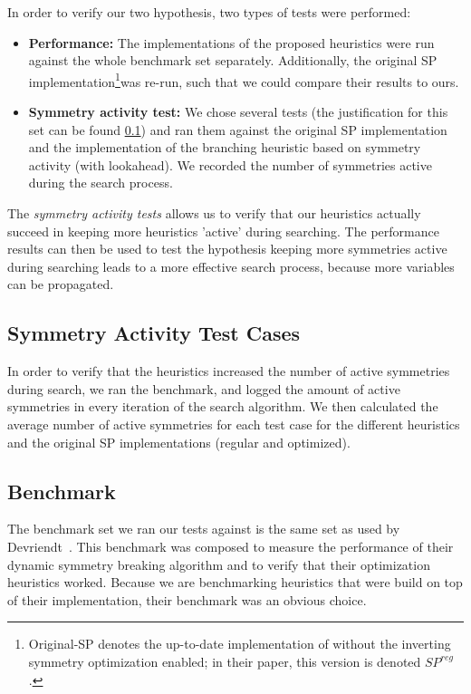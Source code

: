 
In order to verify our two hypothesis, two types of tests were performed:

\begin{itemize}
	\item {\bf Performance:}
		The implementations of the proposed heuristics were run against the whole
		benchmark set separately.
		Additionally, the original SP implementation\footnote{
			Original-SP denotes the up-to-date implementation of \cite{devriendt2012symmetry}
			without the inverting symmetry optimization enabled; in their paper, this version is denoted $SP^{reg}$.
		}was re-run, such that we could compare their results to ours.

	\item {\bf Symmetry activity test:}
		We chose several tests (the justification for this set can be found
		\ref{ssec:sym_act_test_cases}) and ran them against the original SP implementation and the
		implementation of the branching heuristic based on symmetry activity (with lookahead).
		We recorded the number of symmetries active during the search process.

\end{itemize}

The \emph{symmetry activity tests} allows us to verify that our heuristics actually succeed in
keeping more heuristics 'active' during searching.
The performance results can then be used to test the hypothesis
keeping more symmetries active during searching leads to a more effective search process,
because more variables can be propagated.

\subsection{Symmetry Activity Test Cases}
\label{ssec:sym_act_test_cases}
	In order to verify that the heuristics increased the number of active symmetries during search,
	we ran the benchmark, and logged the amount of active symmetries in every iteration of the
	search algorithm.
	We then calculated the average number of active symmetries for each test case for the different
	heuristics and the original SP implementations (regular and optimized).

\subsection{Benchmark}
\label{ssec:benchmark}
	The benchmark set we ran our tests against is the same set as used by Devriendt~\cite{devriendt2012symmetry}.
	This benchmark was composed to measure the performance of their dynamic symmetry
	breaking algorithm and to verify that their optimization heuristics worked.
	Because we are benchmarking heuristics that were build on top of their implementation, their
	benchmark was an obvious choice.

